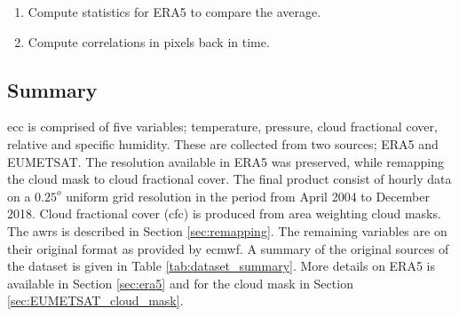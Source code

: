 \begin{enumerate}
    \item Compute statistics for ERA5 to compare the average. 
    \item Compute correlations in pixels back in time.
\end{enumerate}


\subsection{Summary}
\acrshort{ecc} is comprised of five variables; temperature, pressure, cloud fractional cover, relative and specific humidity. These are collected from two sources; ERA5 and EUMETSAT. The resolution available in ERA5 was preserved, while remapping the cloud mask to cloud fractional cover. 
The final product consist of %
hourly data on a $0.25^o$ uniform grid resolution in the period from April 2004 to December 2018. Cloud fractional cover (\acrshort{cfc}) is produced from area weighting cloud masks. The \acrshort{awrs} is described in Section \ref{sec:remapping}. The remaining variables are on their original format as provided by \acrfull{ecmwf}. A summary of the original sources of the dataset is given in Table \ref{tab:dataset_summary}. More details on ERA5 is available in Section \ref{sec:era5} and for the cloud mask in Section \ref{sec:EUMETSAT_cloud_mask}. 
\clearpage
